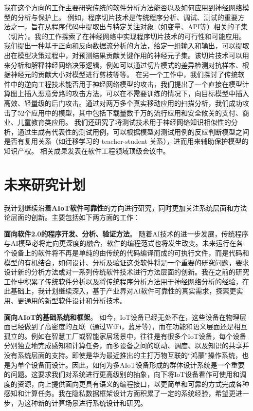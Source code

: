 \documentclass[12pt]{article}
\begin{document}
我在这个方向的工作主要研究传统的软件分析方法能否以及如何应用到神经网络模型的分析与保护上。
例如，程序切片技术是传统程序分析、调试、测试的重要方法之一，旨在从程序代码中提取出与特定关注对象（如变量、API等）相关的子集（切片）。我的工作探索了在神经网络中实现程序切片技术的可行性和可能应用。我们提出一种基于正向和反向数据流分析的方法，给定一组输入和输出，可以提取出在模型决策过程中，对预测结果贡献关键作用的神经元子集。该切片技术可以用来分析和解释神经网络决策逻辑，例如可以通过切片模式的差异检测对抗样本、根据神经元的贡献大小对模型进行剪枝等等。
在另一个工作中，我们探讨了传统软件中的逆向工程技术能否用于神经网络模型的攻击，我们提出了一个直接在模型计算图上插入恶意旁路的攻击方法，可以在不需要训练的情况下，向目标模型中插入高效、轻量级的后门攻击。通过对两万多个真实移动应用的扫描分析，我们成功攻击了52个应用中的模型，其中包括下载量数千万的流行应用和安全攸关的支付、商业、儿童教育类应用。
我们还研究了将测试技术用于神经网络知识相似性的分析，通过生成有代表性的测试用例，可以根据模型对测试用例的反应判断模型之间是否有复用关系（如迁移学习的 teacher-student 关系），进而用来辅助保护模型的知识产权。
相关成果\cite{li2021deeppayload,zhang2020dynamic,li2021modeldiff}发表在软件工程领域顶级会议中。


\section{未来研究计划}

我计划继续沿着\textbf{AIoT软件可靠性}的方向进行研究，同时更加关注系统层面和方法论层面的创新。主要包括如下两方面的工作：


\textbf{面向软件2.0的程序开发、分析、验证方法}。
随着AI技术的进一步发展，传统程序与AI模型必将走向更深度的融合，软件的编程范式也将发生改变。未来运行在各个设备上的软件将不再是单纯的由传统的代码编译而成的可执行文件，而是代码和模型的有机结合，如何设计、分析及验证这类软件将是一个重要的研究问题，要求设计新的分析方法或对一系列传统软件技术进行方法层面的创新。我在之前的研究工作中积累了传统软件分析以及将传统程序分析方法用于神经网络分析的经验，在此基础上，我计划继续深入，基于产业界对AI软件可靠性的真实需求，探索更实用、更通用的新型软件设计和分析技术。

\textbf{面向AIoT的基础系统和框架}。
如今，IoT设备已经无处不在，这些设备在物理层面已经做到了高密度的互联（通过WiFi，蓝牙等），而在功能和语义层面还是相互孤立的。例如在智慧工厂或智能家居场景中，往往是有很多个IoT设备，每个设备分别独立地完成感知和计算任务，而多设备之间的联动、调度、以及知识的共享并没有系统层面的支持。即使是华为最近推出的主打万物互联的“鸿蒙”操作系统，也是为单个设备而设计。因此，如何为多AIoT设备形成的群体设计系统是一个重要的问题。这要求我们对系统进行更高级别的抽象，向下将IoT设备看作可使用和调度的资源，向上提供面向更具有语义的编程接口，以更简单和可靠的方式完成各种感知和计算任务。我在隐私数据框架设计方面积累了一定的系统经验，希望更进一步，为这种新的计算场景进行系统设计和研究。




{


}
\end{document}
